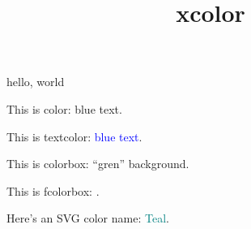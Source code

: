 \documentclass{amsart}
\title{xcolor}
\begin{document}
\maketitle

hello, world



This is color: {\color{blue} blue text}.

This is textcolor: \textcolor{blue}{blue text}.

This is colorbox: \colorbox{gren}{``gren'' background}.

This is fcolorbox: .

Here's an SVG color name: \textcolor{Teal}{Teal}.
\end{document}
